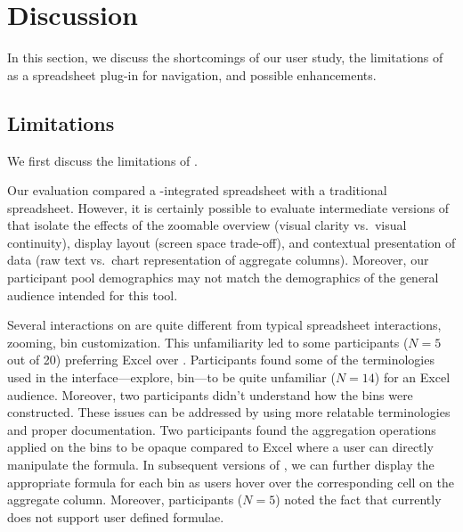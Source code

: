 \section{Discussion}
\label{sec:discuss}

In this section, we discuss the shortcomings of our user study, 
the limitations of \noah as a spreadsheet plug-in for navigation, 
and possible enhancements.

\subsection{Limitations}
We first discuss the limitations of \noah. 

 Our evaluation compared a \noah-integrated spreadsheet with a traditional spreadsheet. However, it is certainly possible to evaluate intermediate versions of \noah that isolate the effects of the zoomable overview (visual clarity vs.~visual continuity), display layout (screen space trade-off), and 
contextual presentation of data (raw text vs.~chart representation of aggregate columns). Moreover, our participant pool demographics may not match the demographics of the general audience intended for this tool. 

 Several interactions on \noah 
are quite different from typical spreadsheet interactions, \eg zooming, bin customization. 
This unfamiliarity led to some participants ($N=5$ out of 20) 
preferring Excel over \noah.  Participants found some of the terminologies 
used in the interface---\eg explore, bin---to be quite 
unfamiliar ($N=14$)  for an Excel audience. 
Moreover, two participants didn’t understand how the bins were constructed. 
These issues can be addressed by using more relatable terminologies and proper documentation. 
Two participants found the aggregation operations 
applied on the bins to be opaque compared to Excel 
where a user can directly manipulate the formula. 
In subsequent versions of \noah, we can further 
display the appropriate formula for each bin as users hover 
over the corresponding cell on the aggregate column. 
Moreover, participants ($N=5$) noted the fact that \noah currently 
does not support user defined formulae.

